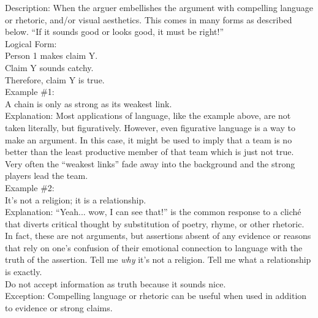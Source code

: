 \documentclass[a4paper,12pt,single,pdftex]{scrartcl}
\begin{document}
  
    
      Description: When the arguer embellishes the argument with compelling language or rhetoric, and/or visual aesthetics. This comes in many forms as described below. “If it sounds good or looks good, it must be right!”
    \\

    
      Logical Form:
    \\

    
      Person 1 makes claim Y.
    \\

    
      Claim Y sounds catchy.
    \\

    
      Therefore, claim Y is true.
    \\

    
      Example \#1:
    \\

    
      A chain is only as strong as its weakest link.
    \\

    
      Explanation: Most applications of language, like the example above, are not taken literally, but figuratively.  However, even figurative language is a way to make an argument.  In this case, it might be used to imply that a team is no better than the least productive member of that team which is just not true.  Very often the “weakest links” fade away into the background and the strong players lead the team.
    \\

    
      Example \#2:
    \\

    
      It’s not a religion; it is a relationship.
    \\

    
      Explanation: “Yeah... wow, I can see that!” is the common response to a cliché that diverts critical thought by substitution of poetry, rhyme, or other rhetoric.  In fact, these are not arguments, but assertions absent of any evidence or reasons that rely on one's confusion of their emotional connection to language with the truth of the assertion.  Tell me {\it why} it’s not a religion.  Tell me what a relationship is exactly. 
    \\

    
      Do not accept information as truth because it sounds nice.
    \\

    
      Exception: Compelling language or rhetoric can be useful when used in addition to evidence or strong claims.
    \\
\end{document}
